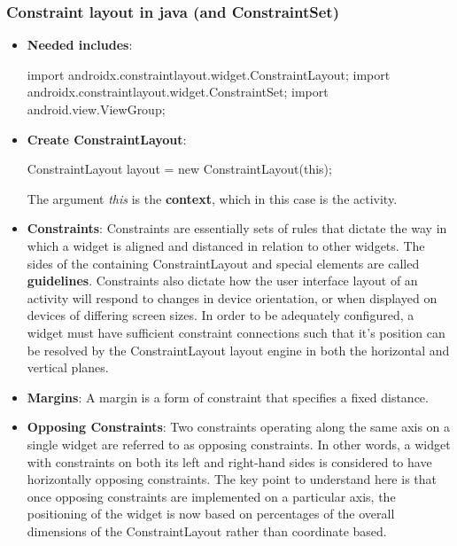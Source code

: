 \documentclass{report}
\begin{document}
    \subsubsection{Constraint layout in java (and ConstraintSet)}
    \begin{itemize}
        \item \textbf{Needed includes}:
            \bigbreak \noindent 
            \begin{javacode}
                import androidx.constraintlayout.widget.ConstraintLayout;
                import androidx.constraintlayout.widget.ConstraintSet;
                import android.view.ViewGroup;
            \end{javacode}
        \item \textbf{Create ConstraintLayout}:
            \bigbreak \noindent 
            \begin{javacode}
                ConstraintLayout layout = new ConstraintLayout(this);
            \end{javacode}
            The argument \textit{this} is the \textbf{context}, which in this case is the activity.
        \item \textbf{Constraints}: Constraints are essentially sets of rules that dictate the way in which a widget is aligned and distanced in relation to other widgets. The sides of the containing ConstraintLayout and special elements are called \textbf{guidelines}.
            \bigbreak \noindent 
            Constraints also dictate how the user interface layout of an activity will respond to changes in device orientation, or when displayed on devices of differing screen sizes. In order to be adequately configured, a widget must have sufficient constraint connections such that it’s position can be resolved by the ConstraintLayout layout engine in both the horizontal and vertical planes.
        \item \textbf{Margins}: A margin is a form of constraint that specifies a fixed distance. 
        \item \textbf{Opposing Constraints}: Two constraints operating along the same axis on a single widget are referred to as opposing constraints. In other words, a widget with constraints on both its left and right-hand sides is considered to have horizontally opposing constraints. 
            \bigbreak \noindent 
            The key point to understand here is that once opposing constraints are implemented on a particular axis, the positioning of the widget is now based on percentages of the overall dimensions of the ConstraintLayout rather than coordinate based.

\end{itemize}
\end{document}
